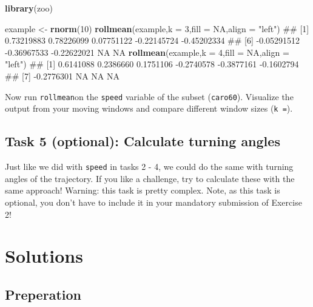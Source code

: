 \documentclass[]{book}
\newenvironment{Shaded}{\begin{snugshade}}{\end{snugshade}}
\newcommand{\KeywordTok}[1]{\textcolor[rgb]{0.13,0.29,0.53}{\textbf{#1}}}
\newcommand{\DataTypeTok}[1]{\textcolor[rgb]{0.13,0.29,0.53}{#1}}
\newcommand{\DecValTok}[1]{\textcolor[rgb]{0.00,0.00,0.81}{#1}}
\newcommand{\StringTok}[1]{\textcolor[rgb]{0.31,0.60,0.02}{#1}}
\newcommand{\OtherTok}[1]{\textcolor[rgb]{0.56,0.35,0.01}{#1}}
\newcommand{\NormalTok}[1]{#1}
\begin{document}
\begin{Shaded}
\begin{Highlighting}[]

\KeywordTok{library}\NormalTok{(zoo)}

\NormalTok{example <-}\StringTok{ }\KeywordTok{rnorm}\NormalTok{(}\DecValTok{10}\NormalTok{)}
\KeywordTok{rollmean}\NormalTok{(example,}\DataTypeTok{k =} \DecValTok{3}\NormalTok{,}\DataTypeTok{fill =} \OtherTok{NA}\NormalTok{,}\DataTypeTok{align =} \StringTok{"left"}\NormalTok{)}
\NormalTok{##  [1]  0.73219883  0.78226099  0.07751122 -0.22145724 -0.45202334}
\NormalTok{##  [6] -0.05291512 -0.36967533 -0.22622021          NA          NA}
\KeywordTok{rollmean}\NormalTok{(example,}\DataTypeTok{k =} \DecValTok{4}\NormalTok{,}\DataTypeTok{fill =} \OtherTok{NA}\NormalTok{,}\DataTypeTok{align =} \StringTok{"left"}\NormalTok{)}
\NormalTok{##  [1]  0.6141088  0.2386660  0.1751106 -0.2740578 -0.3877161 -0.1602794}
\NormalTok{##  [7] -0.2776301         NA         NA         NA}
\end{Highlighting}
\end{Shaded}

Now run \texttt{rollmean}on the \texttt{speed} variable of the subset
(\texttt{caro60}). Visualize the output from your moving windows and
compare different window sizes (\texttt{k\ =}).

\subsection{Task 5 (optional): Calculate turning
angles}\label{task-5-optional-calculate-turning-angles}

Just like we did with \texttt{speed} in tasks 2 - 4, we could do the
same with turning angles of the trajectory. If you like a challenge, try
to calculate these with the same approach! Warning: this task is pretty
complex. Note, as this task is optional, you don't have to include it in
your mandatory submission of Exercise 2!

\section{Solutions}\label{solutions-1}

\subsection{Preperation}\label{preperation-2}
\end{document}
